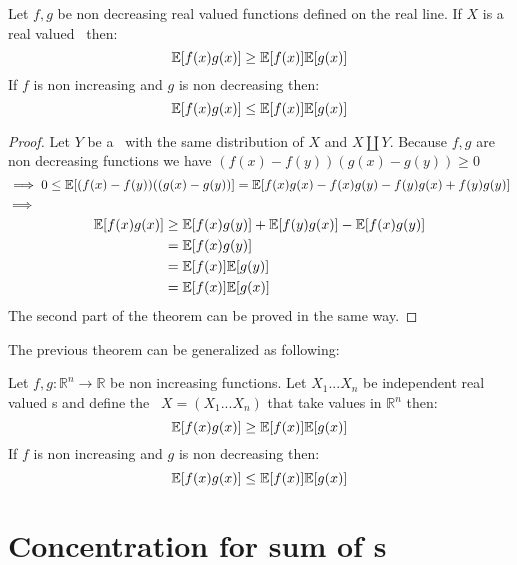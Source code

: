 \begin{teo}
	Let $f,g$ be non decreasing real valued functions defined on the real line. If $X$ is a real valued \rv \  then:$$\mathbb{E}[f(x)g(x)]\geq \mathbb{E}[f(x)]\mathbb{E}[g(x)]$$
	If $f$ is non increasing and $g$ is non decreasing then:
	$$\mathbb{E}[f(x)g(x)]\leq \mathbb{E}[f(x)]\mathbb{E}[g(x)]$$ 
\end{teo}
\begin{proof}
	Let $Y$ be a \rv \  with the same distribution of $X$ and $X\coprod Y$. Because $f,g$ are non decreasing functions we have $(f(x)-f(y))(g(x)-g(y))\geq 0$
	\[
		\implies  0 \leq \mathbb{E}[(f(x)-f(y))((g(x)-g(y))]=\mathbb{E}[f(x)g(x)-f(x)g(y)-f(y)g(x) + f(y)g(y)]
	\]
	$\implies$
	\[
	\begin{split}
\mathbb{E}[f(x)g(x)] &\geq \mathbb{E}[f(x)g(y)]+ \mathbb{E}[f(y)g(x)]- \mathbb{E}[f(x)g(y)] \\&=\mathbb{E}[f(x)g(y)]\\&=\mathbb{E}[f(x)]\mathbb{E}[g(y)]\\&=\mathbb{E}[f(x)]\mathbb{E}[g(x)]
	\end{split}
	\]
	The second part of the theorem can be proved in the same way.
\end{proof}
The previous theorem can be generalized as following:
\begin{teo}
	Let $f,g: \mathbb{R}^n\to \mathbb{R}$ be non increasing functions. Let $X_1...X_n$ be independent real valued \rv s and define the \rv \ $X=(X_1...X_n)$ that take values in $\mathbb{R}^n$ then:
	$$\mathbb{E}[f(x)g(x)]\geq \mathbb{E}[f(x)]\mathbb{E}[g(x)]$$
	If $f$ is non increasing and $g$ is non decreasing then:
	$$\mathbb{E}[f(x)g(x)]\leq \mathbb{E}[f(x)]\mathbb{E}[g(x)]$$
\end{teo}

\section{Concentration for sum of \rv s}

